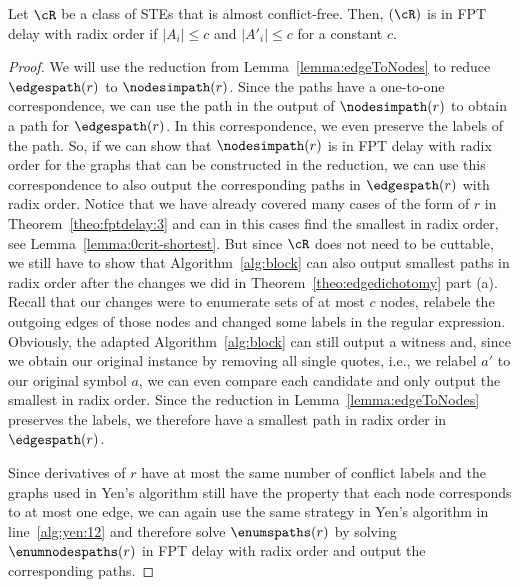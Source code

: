 \documentclass[a4paper,english]{lipics-v2016}
\theoremstyle{plain}
\begin{document}
 \begin{lemma} 
	Let $\cR$ be a class of STEs that is almost conflict-free. Then, \enumedgespaths$(\cR)$ is in FPT delay with radix order if $|A_i|\leq c$ and $|A'_i|\leq c$ for a constant $c$.
\end{lemma}
\begin{proof} 
	We will use the reduction from Lemma~\ref{lemma:edgeToNodes} to reduce $\edgespath(r)$ to $\nodesimpath(r)$. Since the paths have a one-to-one correspondence, we can use the path in the output of $\nodesimpath(r)$ to obtain a path for $\edgespath(r)$. In this correspondence, we even preserve the labels of the path.
	 So, if we can show that $\nodesimpath(r)$ is in FPT delay with radix order for the graphs that can be constructed in the reduction, we can use this correspondence to also output the corresponding paths in $\edgespath(r)$ with radix order. Notice that we have already covered many cases of the form of $r$ in Theorem~\ref{theo:fptdelay:3} and can in this cases find the smallest in radix order, see Lemma~\ref{lemma:0crit-shortest}.
	 But since $\cR$ does not need to be cuttable, we still have to show that Algorithm~\ref{alg:block} can also output smallest paths in radix order after the changes we did in Theorem~\ref{theo:edgedichotomy} part (a).
	 Recall that our changes were to enumerate sets of at most $c$ nodes, relabele the outgoing edges of those nodes and changed some labels in the regular expression.
	 Obviously, the adapted Algorithm~\ref{alg:block} can still
         output a witness and, since we obtain our original instance
         by removing all single quotes, i.e., we relabel $a'$ to our original symbol $a$, we can even compare each candidate and only output the smallest in radix order.
	 Since the reduction in Lemma~\ref{lemma:edgeToNodes} preserves the labels, we therefore have a smallest path in radix order in $\edgespath(r)$.
	  
	Since derivatives of $r$ have at most the same number of conflict labels and the graphs used in Yen's algorithm still have the property that each node corresponds to at most one edge, we can again use the same strategy in Yen's algorithm in line~\ref{alg:yen:12} and therefore solve $\enumspaths(r)$ by solving $\enumnodespaths(r)$ in FPT delay with radix order and output the corresponding paths.
\end{proof}


 
\end{document}
